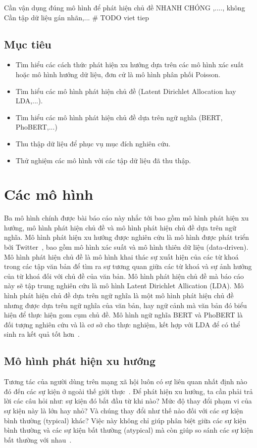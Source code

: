 Cần vận dụng đúng mô hình để phát hiện chủ đề NHANH CHÓNG ,...., không Cần
tập dữ liệu gán nhãn,...
\# TODO viet tiep

\subsection{Mục tiêu}
\begin{itemize}
	\item Tìm hiểu các cách thức phát hiện xu hướng dựa trên các mô hình xác
		suất hoặc mô hình hướng dữ liệu, đơn cử là mô hình phân phối Poisson.

	\item Tìm hiểu các mô hình phát hiện chủ đề (Latent Dirichlet Allocation
		hay LDA,...).

	\item Tìm hiểu các mô hình phát hiện chủ đề dựa trên ngữ nghĩa (BERT,
		PhoBERT,...)
	
	\item Thu thập dữ liệu để phục vụ mục đích nghiên cứu.
	
	\item Thử nghiệm các mô hình với các tập dữ liệu đã thu thập.
\end{itemize}

\section{Các mô hình}
\label{sec:models}
Ba mô hình chính được bài báo cáo này nhắc tới bao gồm mô hình phát hiện xu
hướng, mô hình phát hiện chủ đề và mô hình phát hiện chủ đề dựa trên ngữ nghĩa.
Mô hình phát hiện xu hướng được nghiên cứu là mô hình được phát triển bởi
Twitter~\cite{hendricksonTrendDetectionSocial2015}, bao gồm mô hình xác suất và
mô hình thiên dữ liệu (data-driven). Mô hình phát hiện chủ đề là mô hình khai
thác sự xuất hiện của các từ khoá trong các tập văn bản để tìm ra sự tương quan
giữa các từ khoá và sự ảnh hưởng của từ khoá đối với chủ đề của văn bản. Mô
hình phát hiện chủ đề mà báo cáo này sẽ tập trung nghiên cứu là mô hình Latent
Dirichlet Allication (LDA). Mô hình phát hiện chủ đề dựa trên ngữ nghĩa là một
mô hình phát hiện chủ đề nhưng được dựa trên ngữ nghĩa của văn bản, hay ngữ
cảnh mà văn bản đó biểu hiện để thực hiện gom cụm chủ đề. Mô hình ngữ nghĩa
BERT và PhoBERT là đối tượng nghiên cứu và là cơ sở cho thực nghiệm, kết hợp
với LDA để có thể sinh ra kết quả tốt hơn~\cite{lamGomCumVan2021}.

\subsection{Mô hình phát hiện xu hướng}
Tương tác của người dùng trên mạng xã hội luôn có sự liên quan nhất định nào đó
đến các sự kiện ở ngoài thế giới
thực~\cite{hendricksonTrendDetectionSocial2015}. Để phát hiện xu hướng, ta cần
phải trả lời các câu hỏi như: sự kiện đó bắt đầu từ khi nào? Mức độ thay đổi
phạm vi của sự kiện này là lớn hay nhỏ? Và chúng thay đổi như thế nào đối với
các sự kiện bình thường (typical) khác? Việc này không chỉ giúp phân biệt giữa
các sự kiện bình thường và các sự kiện bất thường (atypical) mà còn giúp so
sánh các sự kiện bất thường với
nhau~\cite{hendricksonTrendDetectionSocial2015}.

